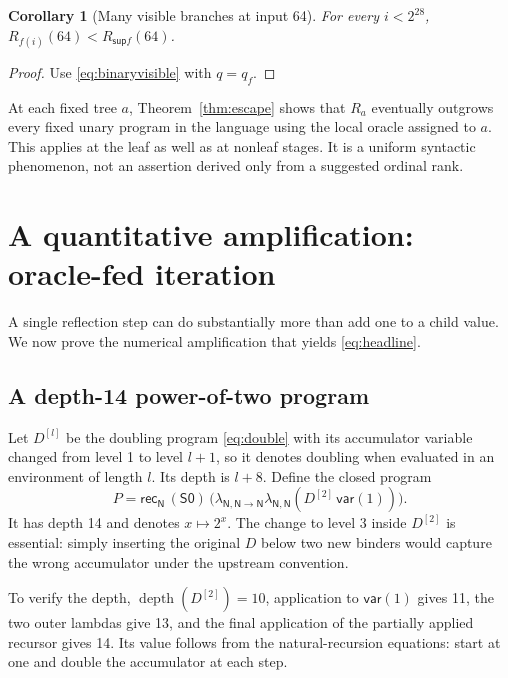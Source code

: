 \documentclass[11pt]{article}
\newtheorem{corollary}[theorem]{Corollary}
\theoremstyle{definition}
\newcommand{\Sup}{\mathsf{sup}}
\newcommand{\tyN}{\mathsf N}
\newcommand{\depth}{\operatorname{depth}}
\newcommand{\Sc}{\mathsf S}
\newcommand{\Rc}{\mathsf{rec}}
\begin{document}
\begin{corollary}[Many visible branches at input 64]\label{cor:many}
For every $i<2^{28}$,
$R_{f(i)}(64)<R_{\Sup f}(64)$.
\end{corollary}
\begin{proof}
Use \eqref{eq:binaryvisible} with $q=q_f$.
\end{proof}

At each fixed tree $a$, Theorem~\ref{thm:escape} shows that $R_a$ eventually
outgrows every fixed unary program in the language using the local oracle
assigned to $a$. This applies at the leaf as well as at nonleaf stages. It
is a uniform syntactic phenomenon, not an assertion derived only from a
suggested ordinal rank.

\section{A quantitative amplification: oracle-fed iteration}
\label{sec:towerengine}

A single reflection step can do substantially more than add one to a child
value. We now prove the numerical amplification that yields
\eqref{eq:headline}.

\subsection{A depth-14 power-of-two program}

Let $D^{[l]}$ be the doubling program \eqref{eq:double} with its accumulator
variable changed from level 1 to level $l+1$, so it denotes doubling when
evaluated in an environment of length $l$. Its depth is $l+8$. Define the
closed program
\begin{equation}\label{eq:powprogram}
 P=\Rc_{\tyN}\,(\Sc\mathsf0)\,
 \bigl(\lambda_{\tyN,\tyN\to\tyN}
       \lambda_{\tyN,\tyN}
       (D^{[2]}\,\mathsf{var}(1))\bigr).
\end{equation}
It has depth 14 and denotes $x\mapsto2^x$. The change to level 3 inside
$D^{[2]}$ is essential: simply inserting the original $D$ below two new
binders would capture the wrong accumulator under the upstream convention.

To verify the depth, $\depth(D^{[2]})=10$, application to
$\mathsf{var}(1)$ gives 11, the two outer lambdas give 13, and the final
application of the partially applied recursor gives 14. Its value follows
from the natural-recursion equations: start at one and double the
accumulator at each step.
\end{document}
